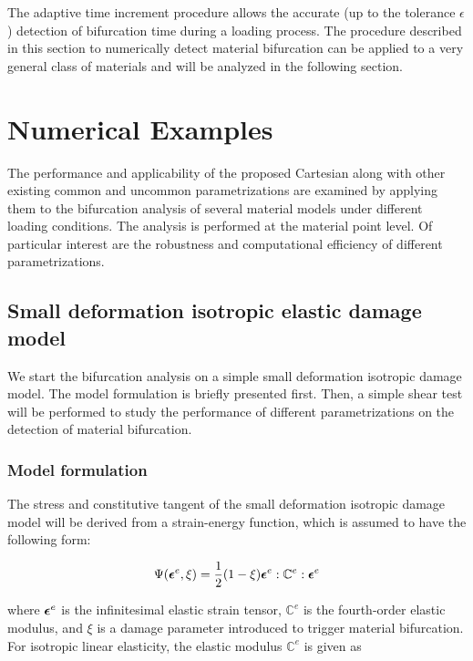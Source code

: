 \documentclass[12pt]{article}
\numberwithin{equation}{section}
\begin{document}
The adaptive time increment procedure allows the accurate (up to the
tolerance $\epsilon$) detection of bifurcation time during a loading
process. The procedure described in this section to numerically detect 
material bifurcation can be applied to a very general class of 
materials and will be analyzed in the following section.

\section{Numerical Examples}
\label{sec:numerical-examples}

The performance and applicability of the proposed Cartesian along with 
other existing common and uncommon parametrizations are examined by 
applying them to the bifurcation analysis of several material models 
under different loading conditions. The analysis is performed at the 
material point level. Of particular interest are the robustness and 
computational efficiency of different parametrizations.

\subsection{Small deformation isotropic elastic damage model}
\label{subsec:isotropic}

We start the bifurcation analysis on a simple small deformation 
isotropic damage model. The model formulation is briefly presented 
first. Then, a simple shear test will be performed to study the 
performance of different parametrizations on the detection of material 
bifurcation.

\subsubsection{Model formulation}

The stress and constitutive tangent of the small deformation isotropic 
damage model will be derived from a strain-energy function, which is 
assumed to have the following form:

\begin{equation}\label{eq:iso_psi}
 \Psi({\boldsymbol{\epsilon}} ^e, \xi)
   = \frac{1}{2} (1 - \xi) 
     {\boldsymbol{\epsilon}} ^e : \mathbb{C}^e : {\boldsymbol{\epsilon}} ^e
\end{equation}

where ${\boldsymbol{\epsilon}}^e$ is the infinitesimal elastic strain tensor, 
$\mathbb{C}^e$ is the fourth-order elastic modulus, and $\xi$ 
is a damage parameter introduced to trigger material bifurcation. For 
isotropic linear elasticity, the elastic modulus $\mathbb{C}^e$ is 
given as
\end{document}
